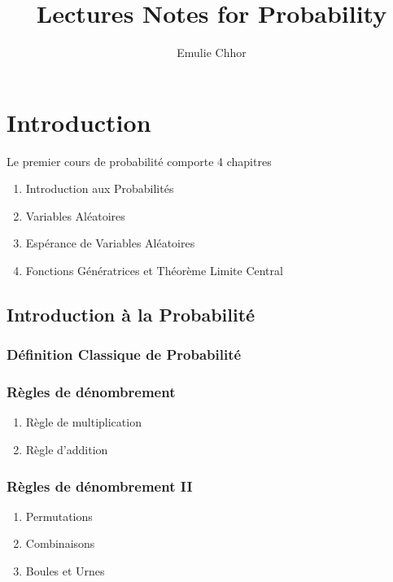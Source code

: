 \documentclass{article}
\begin{document}
\title{Lectures Notes for Probability}
\author{Emulie Chhor}
\maketitle

\section{Introduction}

Le premier cours de probabilité comporte 4 chapitres

\begin{enumerate}
    \item Introduction aux Probabilités
    \item Variables Aléatoires
    \item Espérance de Variables Aléatoires
    \item Fonctions Génératrices et Théorème Limite Central
\end{enumerate}

\subsection{Introduction à la Probabilité}

\subsubsection{Définition Classique de Probabilité}

\subsubsection{Règles de dénombrement}

\begin{enumerate}
    \item Règle de multiplication
    \item Règle d'addition
\end{enumerate}

\subsubsection{Règles de dénombrement II}

\begin{enumerate}
    \item Permutations
    \item Combinaisons
    \item Boules et Urnes
\end{enumerate}
\end{document}
